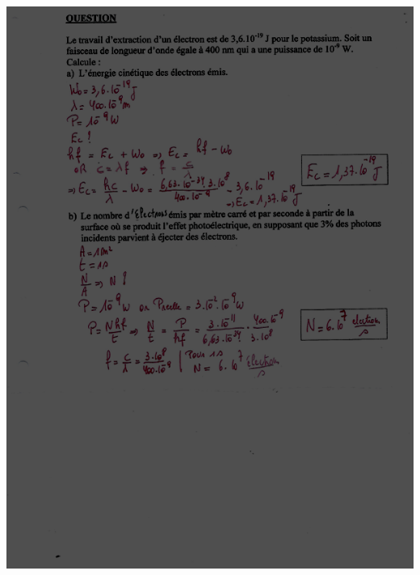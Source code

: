 {\includegraphics[width=17.498cm,height=24.13cm]{Pictures/10000001000002570000033B4A6387CB4865E463.png}

}
